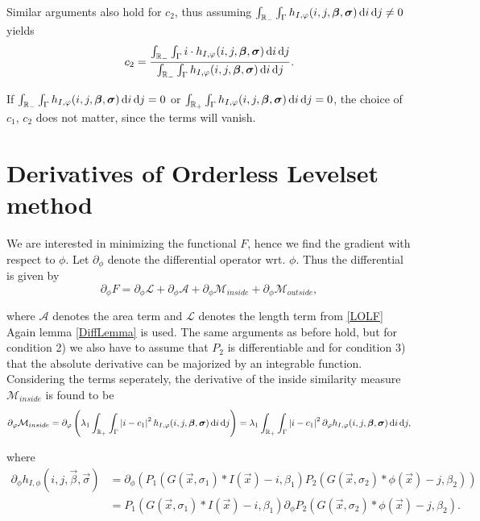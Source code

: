 Similar arguments also hold for $c_2$, thus assuming $\int_{\mathbb R_-}\int_{\Gamma}h_{I,\varphi}(i,j,\boldsymbol{\beta} ,\boldsymbol{\sigma} ) \,{\rm d} i\,{\rm d} j\neq 0$ yields
\begin{equation}
  c_2 = \frac{\int_{\mathbb R_-}\int_{\Gamma} i\cdot h_{I,\varphi}(i,j,\boldsymbol{\beta} ,\boldsymbol{\sigma} ) \,{\rm d} i\,{\rm d} j}{\int_{\mathbb R_-}\int_{\Gamma}h_{I,\varphi}(i,j,\boldsymbol{\beta} ,\boldsymbol{\sigma} ) \,{\rm d} i\,{\rm d} j}.
\end{equation}

If $\int_{\mathbb R_-}\int_{\Gamma}h_{I,\varphi}(i,j,\boldsymbol{\beta} ,\boldsymbol{\sigma} ) \,{\rm d} i\,{\rm d} j=0$ or $\int_{\mathbb R_+}\int_{\Gamma}h_{I,\varphi}(i,j,\boldsymbol{\beta} ,\boldsymbol{\sigma} ) \,{\rm d} i\,{\rm d} j = 0$, the choice of $c_1$, $c_2$ does not matter, since the terms will vanish.

\section{Derivatives of Orderless Levelset method}\label{section:OLder}
We are interested in minimizing the functional $F$, hence we find the gradient with respect to $\phi$. Let $\partial_\phi$ denote the differential operator wrt. $\phi$. Thus the differential is given by
\begin{equation}
  \partial_\phi F = \partial_\phi \mathcal{L} + \partial_\phi \mathcal{A} + \partial_\phi\mathcal{M}_{inside} + \partial_\phi \mathcal{M}_{outside},
\end{equation}

where $\mathcal{A}$ denotes the area term and $\mathcal{L}$ denotes the length term from \eqref{LOLF}\\

Again lemma \ref{DiffLemma} is used. The same arguments as before hold, but for condition 2) we also have to assume that $P_2$ is differentiable and for condition 3) that the absolute derivative can be majorized by an integrable function.\\
Considering the terms seperately, the derivative of the inside similarity measure $\mathcal{M}_{inside}$ is found to be
\begin{equation}
  \partial_\varphi \mathcal{M}_{inside} = \partial_\varphi \left( \lambda_1\int_{\mathbb R_+} \int_{\Gamma} \left| {i-c_1} \right|^2h_{I,\varphi}(i,j,\boldsymbol{\beta} ,\boldsymbol{\sigma} )\,{\rm d} i\,{\rm d} j\right) = \lambda_1\int_{\mathbb R_+} \int_{\Gamma} \left| {i-c_1} \right|^2 \partial_\varphi h_{I,\varphi}(i,j,\boldsymbol{\beta} ,\boldsymbol{\sigma} )\,{\rm d} i\,{\rm d} j,
\end{equation}

where
\begin{equation}
  \begin{split}
    \partial_\phi h_{I,\phi}(i,j,\vec{\beta},\vec{\sigma}) &= \partial_\phi \left(P_1(G(\vec{x},\sigma_1)*I(\vec{x})-i,\beta_1)P_2(G(\vec{x},\sigma_2)*\phi(\vec{x})-j,\beta_2)\right)\\ 
    &= P_1(G(\vec{x},\sigma_1)*I(\vec{x})-i,\beta_1)\partial_\phi P_2(G(\vec{x},\sigma_2)*\phi(\vec{x})-j,\beta_2).
  \end{split}
\end{equation}

